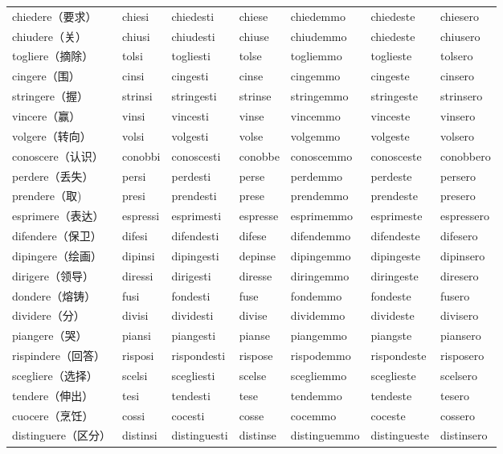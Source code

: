 \documentclass[UTF8,a4paper,titlepage,10pt]{report}
\begin{document}
\begin{enumerate}
\begin{itemize}
\begin{center}
\begin{tabular}{lllllll}
chiedere（要求） & chiesi & chiedesti & chiese & chiedemmo & chiedeste & chiesero\\
chiudere（关） & chiusi & chiudesti & chiuse & chiudemmo & chiedeste & chiusero\\
togliere（摘除） & tolsi & togliesti & tolse & togliemmo & toglieste & tolsero\\
cingere（围） & cinsi & cingesti & cinse & cingemmo & cingeste & cinsero\\
stringere（握） & strinsi & stringesti & strinse & stringemmo & stringeste & strinsero\\
vincere（赢） & vinsi & vincesti & vinse & vincemmo & vinceste & vinsero\\
volgere（转向） & volsi & volgesti & volse & volgemmo & volgeste & volsero\\
conoscere（认识） & conobbi & conoscesti & conobbe & conoscemmo & conosceste & conobbero\\
perdere（丢失） & persi & perdesti & perse & perdemmo & perdeste & persero\\
prendere（取) & presi & prendesti & prese & prendemmo & prendeste & presero\\
esprimere（表达） & espressi & esprimesti & espresse & esprimemmo & esprimeste & espressero\\
difendere（保卫） & difesi & difendesti & difese & difendemmo & difendeste & difesero\\
dipingere（绘画） & dipinsi & dipingesti & depinse & dipingemmo & dipingeste & dipinsero\\
dirigere（领导） & diressi & dirigesti & diresse & diringemmo & diringeste & diresero\\
dondere（熔铸） & fusi & fondesti & fuse & fondemmo & fondeste & fusero\\
dividere（分） & divisi & dividesti & divise & dividemmo & divideste & divisero\\
piangere（哭） & piansi & piangesti & pianse & piangemmo & piangste & piansero\\
rispindere（回答） & risposi & rispondesti & rispose & rispodemmo & rispondeste & risposero\\
scegliere（选择） & scelsi & scegliesti & scelse & scegliemmo & sceglieste & scelsero\\
tendere（伸出） & tesi & tendesti & tese & tendemmo & tendeste & tesero\\
cuocere（烹饪） & cossi & cocesti & cosse & cocemmo & coceste & cossero\\
distinguere（区分） & distinsi & distinguesti & distinse & distinguemmo & distingueste & distinsero\\

\end{tabular}
\end{center}
\end{itemize}
\end{enumerate}
\end{document}
